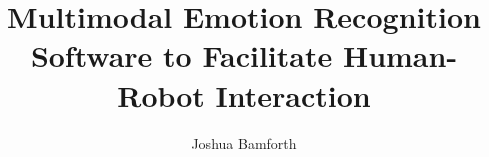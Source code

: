 \title{Multimodal Emotion Recognition Software to Facilitate Human-Robot Interaction}


\author{Joshua Bamforth}








